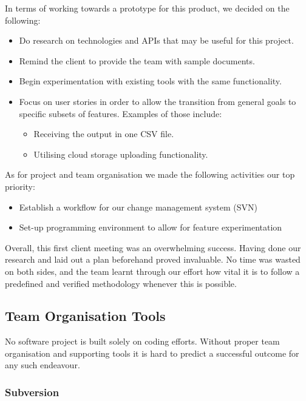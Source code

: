 \documentclass{l3proj}
\begin{document}
  In terms of working towards a prototype for this product, we decided on the following:
    \begin{itemize}
        \item Do research on technologies and APIs that may be useful for this project.
        \item Remind the client to provide the team with sample documents.
        \item Begin experimentation with existing tools with the same functionality.
        \item Focus on user stories in order to allow the transition from general goals to specific subsets of features. Examples of those include: 
            \begin{itemize}
                \item Receiving the output in one CSV file.
                \item Utilising cloud storage uploading functionality.
            \end{itemize}
    \end{itemize}
    
  As for project and team organisation we made the following activities our top priority:
  \begin{itemize}
        \item Establish a workflow for our change management system (SVN)
        \item Set-up programming environment to allow for feature experimentation
    \end{itemize}
    

Overall, this first client meeting was an overwhelming success. Having done our research and laid out a plan beforehand proved invaluable. No time was wasted on both sides, and the team learnt through our effort how vital it is to follow a predefined and verified methodology whenever this is possible.

\subsection{Team Organisation Tools}
\label{sec:team_org}

No software project is built solely on coding efforts. Without proper team organisation and supporting tools it is hard to predict a successful outcome for any such endeavour.
\subsubsection{Subversion}
\label{sec:svn}
    
\end{document}
